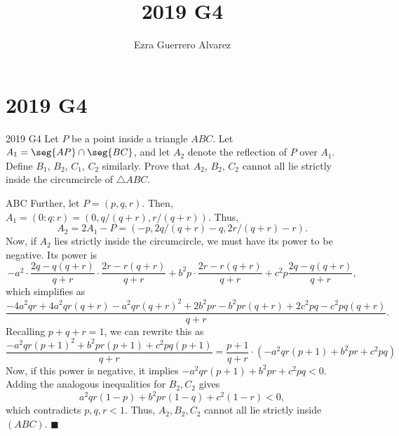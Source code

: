 \documentclass[14pt]{article}
\title{2019 G4}
\author{Ezra Guerrero Alvarez}
\begin{document}
\maketitle
	
\section*{2019 G4}

\begin{statement}{2019 G4}
	Let $P$ be a point inside a triangle $ABC$.
	Let $A_1 = \seg{AP} \cap \seg{BC}$,
	and let $A_2$ denote the reflection of $P$ over $A_1$.
	Define $B_1$, $B_2$, $C_1$, $C_2$ similarly.
	Prove that $A_2$, $B_2$, $C_2$ cannot all lie strictly
	inside the circumcircle of $\triangle ABC$.
\end{statement}
\bary ABC Further, let $P=(p,q,r)$. Then, $A_1=(0:q:r)=(0,q/(q+r),r/(q+r))$. Thus,
\[ A_2 = 2A_1-P=(-p,2q/(q+r)-q,2r/(q+r)-r). \]
Now, if $A_2$ lies strictly inside the circumcircle, we must have its power to be negative. Its power is
\[-a^2\cdot\frac{2q-q(q+r)}{q+r}\cdot\frac{2r-r(q+r)}{q+r}+b^2p\cdot\frac{2r-r(q+r)}{q+r}+c^2p\frac{2q-q(q+r)}{q+r},\]
which simplifies as 
\[ \frac{-4a^2qr+4a^2qr(q+r)-a^2qr(q+r)^2+2b^2pr-b^2pr(q+r)+2c^2pq-c^2pq(q+r)}{q+r}. \]
Recalling $p+q+r=1$, we can rewrite this as
\[ \frac{-a^2qr(p+1)^2+b^2pr(p+1)+c^2pq(p+1)}{q+r}=\frac{p+1}{q+r}\cdot(-a^2qr(p+1)+b^2pr+c^2pq) \]
Now, if this power is negative, it implies $-a^2qr(p+1)+b^2pr+c^2pq<0$. Adding the analogous inequalities for $B_2,C_2$ gives 
\[ a^2qr(1-p)+b^2pr(1-q)+c^2(1-r)<0, \]
which contradicts $p,q,r<1$. Thus, $A_2,B_2,C_2$ cannot all lie strictly inside $(ABC)$. $\blacksquare$
	
\end{document}
